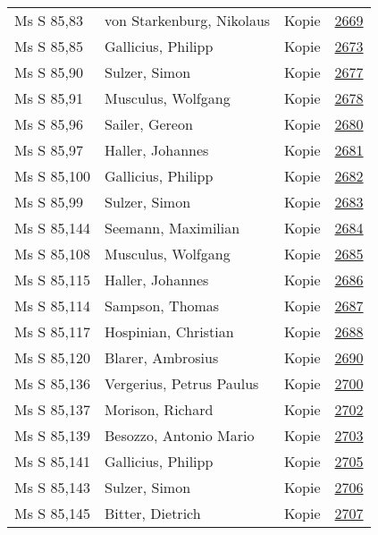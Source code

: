 \documentclass[10pt,a4paper,landscape]{report}
\begin{document}
\begin{longtable}{p{16cm}p{4cm}lr}
Ms S 85,83	&	von Starkenburg, Nikolaus	&	Kopie	&	\href{http://130.60.24.72/assignment/2669}{2669}\\
Ms S 85,85	&	Gallicius, Philipp	&	Kopie	&	\href{http://130.60.24.72/assignment/2673}{2673}\\
Ms S 85,90	&	Sulzer, Simon	&	Kopie	&	\href{http://130.60.24.72/assignment/2677}{2677}\\
Ms S 85,91	&	Musculus, Wolfgang	&	Kopie	&	\href{http://130.60.24.72/assignment/2678}{2678}\\
Ms S 85,96	&	Sailer, Gereon	&	Kopie	&	\href{http://130.60.24.72/assignment/2680}{2680}\\
Ms S 85,97	&	Haller, Johannes	&	Kopie	&	\href{http://130.60.24.72/assignment/2681}{2681}\\
Ms S 85,100	&	Gallicius, Philipp	&	Kopie	&	\href{http://130.60.24.72/assignment/2682}{2682}\\
Ms S 85,99	&	Sulzer, Simon	&	Kopie	&	\href{http://130.60.24.72/assignment/2683}{2683}\\
Ms S 85,144	&	Seemann, Maximilian	&	Kopie	&	\href{http://130.60.24.72/assignment/2684}{2684}\\
Ms S 85,108	&	Musculus, Wolfgang	&	Kopie	&	\href{http://130.60.24.72/assignment/2685}{2685}\\
Ms S 85,115	&	Haller, Johannes	&	Kopie	&	\href{http://130.60.24.72/assignment/2686}{2686}\\
Ms S 85,114	&	Sampson, Thomas	&	Kopie	&	\href{http://130.60.24.72/assignment/2687}{2687}\\
Ms S 85,117	&	Hospinian, Christian	&	Kopie	&	\href{http://130.60.24.72/assignment/2688}{2688}\\
Ms S 85,120	&	Blarer, Ambrosius	&	Kopie	&	\href{http://130.60.24.72/assignment/2690}{2690}\\
Ms S 85,136	&	Vergerius, Petrus Paulus	&	Kopie	&	\href{http://130.60.24.72/assignment/2700}{2700}\\
Ms S 85,137	&	Morison, Richard	&	Kopie	&	\href{http://130.60.24.72/assignment/2702}{2702}\\
Ms S 85,139	&	Besozzo, Antonio Mario	&	Kopie	&	\href{http://130.60.24.72/assignment/2703}{2703}\\
Ms S 85,141	&	Gallicius, Philipp	&	Kopie	&	\href{http://130.60.24.72/assignment/2705}{2705}\\
Ms S 85,143	&	Sulzer, Simon	&	Kopie	&	\href{http://130.60.24.72/assignment/2706}{2706}\\
Ms S 85,145	&	Bitter, Dietrich	&	Kopie	&	\href{http://130.60.24.72/assignment/2707}{2707}\\

\end{longtable}
\end{document}
